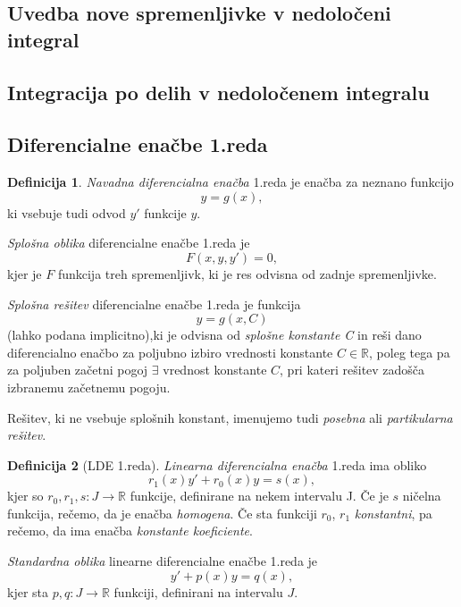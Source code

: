 \documentclass[11pt]{article}
\theoremstyle{definition}
\newtheorem{definicija}{Definicija}[section]
\begin{document}

\subsection{Uvedba nove spremenljivke v nedoločeni integral}
\vspace{0.5cm}


\subsection{Integracija po delih v nedoločenem integralu}
\vspace{0.5cm}


\subsection{Diferencialne enačbe 1.reda}
\vspace{0.5cm}

\begin{definicija}

\textit{Navadna diferencialna enačba} 1.reda je enačba za neznano funkcijo 
$$y=g(x),$$
ki vsebuje tudi odvod $y'$ funkcije $y$.

\textit{Splošna oblika} diferencialne enačbe 1.reda je
$$F(x,y,y')=0,$$
kjer je $F$ funkcija treh spremenljivk, ki je res odvisna od zadnje spremenljivke.

\textit{Splošna rešitev} diferencialne enačbe 1.reda je funkcija 
$$y=g(x,C)$$
(lahko podana implicitno),ki je odvisna od \textit{splošne konstante C} in reši dano diferencialno enačbo za poljubno izbiro vrednosti konstante $C \in \mathbb{R}$, poleg tega pa za poljuben začetni pogoj $\exists$ vrednost konstante $C$, pri kateri rešitev zadošča izbranemu začetnemu pogoju.

Rešitev, ki ne vsebuje splošnih konstant, imenujemo tudi \textit{posebna} ali \textit{partikularna rešitev}.

\end{definicija}

\begin{definicija}[LDE 1.reda]

\textit{Linearna diferencialna enačba} 1.reda ima obliko
$$r_1(x)y' + r_0(x)y = s(x),$$
kjer so $r_0, r_1, s: J \rightarrow \mathbb{R}$ funkcije, definirane na nekem intervalu J. Če je $s$ ničelna funkcija, rečemo, da je enačba \textit{homogena}. Če sta funkciji $r_0$, $r_1$ \textit{konstantni}, pa rečemo, da ima enačba \textit{konstante koeficiente}.

\textit{Standardna oblika} linearne diferencialne enačbe 1.reda je
$$y' + p(x)y = q(x),$$
kjer sta $p, q: J \rightarrow \mathbb{R}$ funkciji, definirani na intervalu $J$.

\end{definicija}
\vspace{0.5cm}
\end{document}
